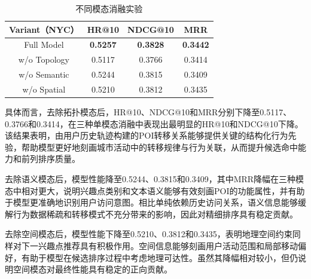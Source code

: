 \documentclass{rjthesis}
\begin{document}
\begin{table}[htbp]
\centering
\caption{不同模态消融实验}
\label{tab:modality_ablation}
\begin{tabular}{c|ccc}
\hline
Variant（NYC） & HR@10 & NDCG@10 & MRR\\
\hline
Full Model
&\textbf{0.5257}&\textbf{0.3828}&\textbf{0.3442}\\

w/o Topology
&0.5117&0.3766&0.3414\\

w/o Semantic
&0.5244&0.3815&0.3409\\

w/o Spatial
&0.5210&0.3812&0.3435\\
\hline
\end{tabular}
\end{table}

具体而言，去除拓扑模态后，HR@10、NDCG@10和MRR分别下降至0.5117、0.3766和0.3414，在三种单模态消融中表现出最明显的HR@10和NDCG@10下降。该结果表明，由用户历史轨迹构建的POI转移关系能够提供关键的结构化行为先验，帮助模型更好地刻画城市活动中的转移规律与行为关联，从而提升候选命中能力和前列排序质量。

去除语义模态后，模型性能降至0.5244、0.3815和0.3409，其中MRR降幅在三种模态中相对更大，说明兴趣点类别和文本语义能够有效刻画POI的功能属性，并有助于模型更准确地识别用户访问意图。相比单纯依赖历史访问关系，语义信息能够缓解行为数据稀疏和转移模式不充分带来的影响，因此对精细排序具有稳定贡献。

去除空间模态后，模型性能下降至0.5210、0.3812和0.3435，表明地理空间约束同样对下一兴趣点推荐具有积极作用。空间信息能够刻画用户活动范围和局部移动偏好，有助于模型在候选排序过程中考虑地理可达性。虽然其降幅相对较小，但仍说明空间模态对最终性能具有稳定的正向贡献。



\end{document}
